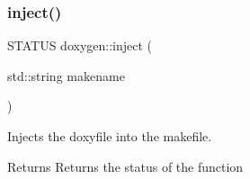 \subsubsection{\texorpdfstring{inject()}{inject()}}
{\footnotesize\ttfamily S\+T\+A\+T\+US doxygen\+::inject (\begin{DoxyParamCaption}\item[{std\+::string}]{makename }\end{DoxyParamCaption})}



Injects the doxyfile into the makefile. 

\begin{DoxyReturn}{Returns}
Returns the status of the function 
\end{DoxyReturn}
